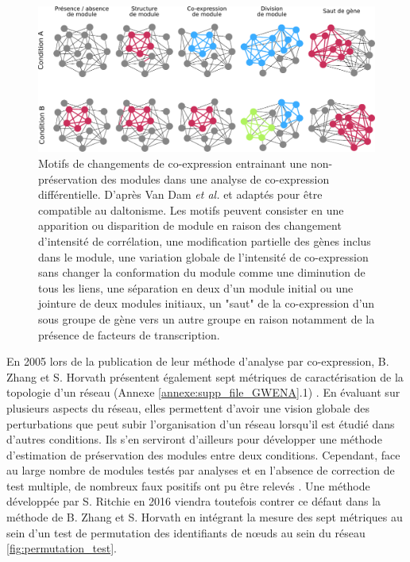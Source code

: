 \begin{figure}
    \centering
    \includegraphics[width=\textwidth]{img/intro/3_coexpr/intro_3_coexpr_codiff.pdf}
    \caption{Motifs de changements de co-expression entrainant une non-préservation des modules dans une analyse de co-expression différentielle. D'après Van Dam \textit{et al.} \cite{VanDam2018} et adaptés pour être compatible au daltonisme. Les motifs peuvent consister en une apparition ou disparition de module en raison des changement d'intensité de corrélation, une modification partielle des gènes inclus dans le module, une variation globale de l'intensité de co-expression sans changer la conformation du module comme une diminution de tous les liens, une séparation en deux d'un module initial ou une jointure de deux modules initiaux, un "saut" de la co-expression d'un sous groupe de gène vers un autre groupe en raison notamment de la présence de facteurs de transcription.}
    \label{fig:differential_coexpression_patterns}
\end{figure}



En 2005 lors de la publication de leur méthode d'analyse par co-expression, B. Zhang et S. Horvath présentent également sept métriques de caractérisation de la topologie d'un réseau (Annexe \ref{annexe:supp_file_GWENA}.1) \cite{Zhang2005a}. En évaluant sur plusieurs aspects du réseau, elles permettent d'avoir une vision globale des perturbations que peut subir l'organisation d'un réseau lorsqu'il est étudié dans d'autres conditions. Ils s'en serviront d'ailleurs pour développer une méthode d'estimation de préservation des modules entre deux conditions. Cependant, face au large nombre de modules testés par analyses et en l'absence de correction de test multiple, de nombreux faux positifs ont pu être relevés \cite{Ritchie2016}. Une méthode développée par S. Ritchie en 2016 viendra toutefois contrer ce défaut dans la méthode de B. Zhang et S. Horvath en intégrant la mesure des sept métriques au sein d'un test de permutation des identifiants de nœuds au sein du réseau \ref{fig:permutation_test}. 


